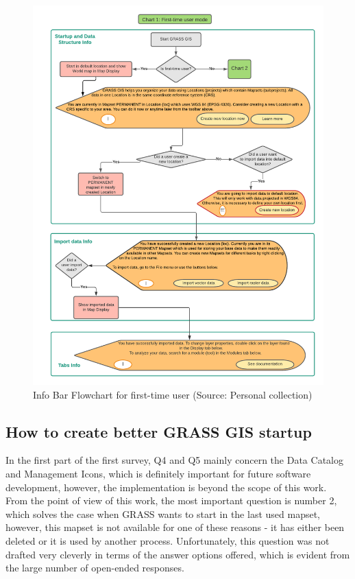 \documentclass[a4paper,10pt,twoside]{article}
\begin{document}
\vspace{0.3cm}
\begin{figure}[hbt!] 
\begin{center}
\includegraphics[width=16cm]{../pictures/first-time_user_diagram.pdf} 
\caption[Info Bars Flowchart for first-time user]{Info Bar Flowchart for first-time user (Source: Personal collection)}
\label{fig:first-time_user_diagram}
\end{center}
\end{figure}

\newpage
\vspace*{-1cm}
\subsection{How to create better GRASS GIS startup}
\label{sec:proposal1}

In the first part of the first survey, Q4 and Q5 mainly concern the Data Catalog and Management Icons, which is definitely important for future software development, however, the implementation is beyond the scope of this work. From the point of view of this work, the most important question is number 2, which solves the case when GRASS wants to start in the last used mapset, however, this mapset is not available for one of these reasons - it has either been deleted or it is used by another process. Unfortunately, this question was not drafted very cleverly in terms of the answer options offered, which is evident from the large number of open-ended responses.
\end{document}
